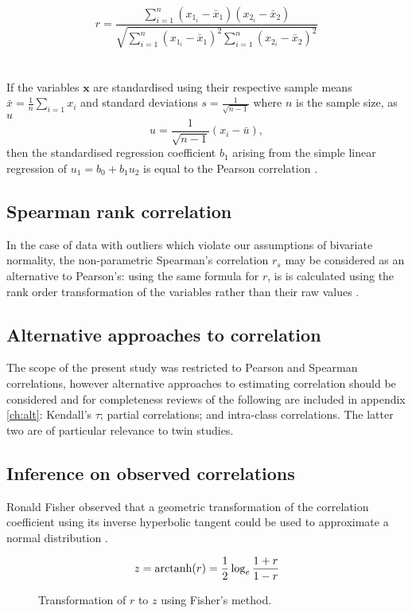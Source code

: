 $$r = \frac{\sum_{i=1}^n (x_{1_i} - \bar{x}_1)(x_{2_i} - \bar{x}_2)}{\sqrt{\sum_{i=1}^n (x_{1_i} - \bar{x}_1)^2 \sum_{i=1}^n (x_{2_i} - \bar{x}_2)^2}}$$
\\
\\
If the variables $\boldsymbol{x}$ are standardised using their respective sample means ${\bar{x}} = \frac{1}{n}\sum_{i=1}x_i$ and standard deviations $s = \frac{1}{\sqrt{n-1}}$ where $n$ is the sample size, as $u$
$$u = \frac{1}{\sqrt{n-1}}(x_i - \bar{u}),$$
then the standardised regression coefficient $b_1$ arising from the simple linear regression of $u_1 = b_0 + b_1 u_2$ is equal to the Pearson correlation \cite{Tu2012}.  

\subsection{Spearman rank correlation}
 In the case of data with outliers which violate our assumptions of bivariate normality, the non-parametric Spearman's correlation $r_s$ may be considered as an alternative to Pearson's: using the same formula for $r$, is is calculated using the rank order transformation of the variables rather than their raw values \cite{Fieller1957,StataCorp2013}. 

\subsection{Alternative approaches to correlation}
The scope of the present study was restricted to Pearson and Spearman correlations, however alternative approaches to estimating correlation should be considered and for completeness reviews of the following are included in appendix \ref{ch:alt}: Kendall's $\tau$; partial correlations; and intra-class correlations.  The latter two are of particular relevance to twin studies.

\subsection{Inference on observed correlations}
Ronald Fisher observed that a geometric transformation of the correlation coefficient using its inverse hyperbolic tangent could be used to approximate a normal distribution \cite{Fisher1915}.  

$$z = \operatorname{arctanh}(r) = \frac{1}{2} \log_e \frac{1+r}{1-r}$$

\begin{figure}[htbp]
\sidecaption[t]
{}
\caption{Transformation of $r$ to $z$ using Fisher's method.}
\label{fig:ztransform}       %
\end{figure}

